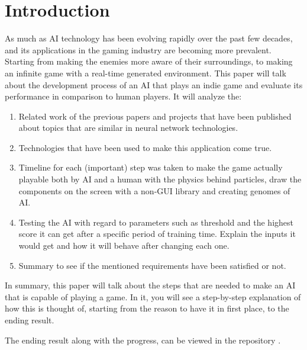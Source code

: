 \chapter{Introduction}
As much as AI technology has been evolving rapidly over the past few decades, and its applications in the gaming industry are becoming more prevalent. Starting from making the enemies more aware of their surroundings, to making an infinite game with a real-time generated environment. This paper will talk about the development process of an AI that plays an indie game and evaluate its performance in comparison to human players. It will  analyze the:

\begin{enumerate}
\item Related work of the previous papers and projects that have been published about topics that are similar in neural network technologies.
\item Technologies that have been used to make this application come true.
\item Timeline for each (important) step was taken to make the game actually playable both by AI and a human with the physics behind particles, draw the components on the screen with a non-GUI library and creating genomes of AI.
\item Testing the AI with regard to parameters such as threshold and the highest score it can get after a specific period of training time. Explain the inputs it would get and how it will behave after changing each one.
\item Summary to see if the mentioned requirements have been satisfied or not.
\end{enumerate}

In summary, this paper will talk about the steps that are needed to make an AI that is capable of playing a game. In it, you will see a step-by-step explanation of how this is thought of, starting from the reason to have it in first place, to the ending result.

The ending result along with the progress, can be viewed in the repository \cite{Mahfouz_Survive_Line_2023}.